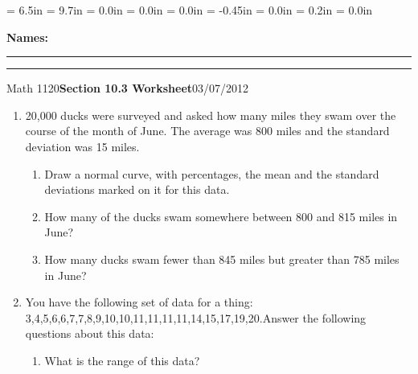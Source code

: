 \documentclass{article}
\begin{document}
\textwidth = 6.5in
\textheight = 9.7in
\oddsidemargin = 0.0in
\evensidemargin = 0.0in
\topmargin = 0.0in
\headheight = -0.45in
\headsep = 0.0in
\parskip = 0.2in
\parindent = 0.0in

\pagestyle{empty}

\textbf{Names:} \rule{6.1in}{0.01in}

\vspace{0.3in}

\noindent\rule{6.7in}{0.01in}

\centerline{Math 1120\hfill{\bf Section 10.3 Worksheet}\hfill 03/07/2012}

\vspace{0.2in}

\begin{enumerate}

\item 20,000 ducks were surveyed and asked how many miles they swam over the course of the month of June. The average was 800 miles and the standard deviation was 15 miles. 

\begin{enumerate}

\item Draw a normal curve, with percentages, the mean and the standard deviations marked on it for this data.

\vspace{2in}

\item How many of the ducks swam somewhere between 800 and 815 miles in June?

\vspace{1in}

\item How many ducks swam fewer than 845 miles but greater than 785 miles in June?

\vspace{2in}

\end{enumerate}

\item You have the following set of data for a thing: 3,4,5,6,6,7,7,8,9,10,10,11,11,11,11,14,15,17,19,20.\newline Answer the following questions about this data:

\begin{enumerate}

\item What is the range of this data?

\newpage


\end{enumerate}
\end{enumerate}
\end{document}
